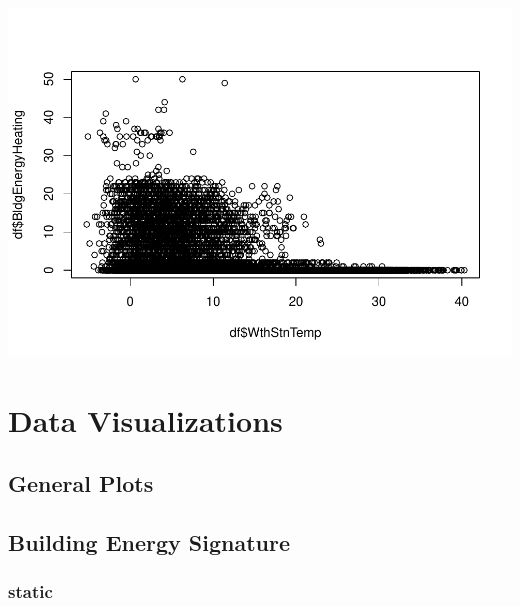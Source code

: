 \documentclass[
]{book}
\begin{document}
\includegraphics{Energy-Data-Analysis-with-R_files/figure-latex/scatterplot plot-1.pdf}

\hypertarget{data-visualizations}{%
\chapter{Data Visualizations}\label{data-visualizations}}

\hypertarget{general-plots}{%
\section{General Plots}\label{general-plots}}

\hypertarget{building-energy-signature}{%
\section{Building Energy Signature}\label{building-energy-signature}}

\hypertarget{static}{%
\subsection{static}\label{static}}
\end{document}
